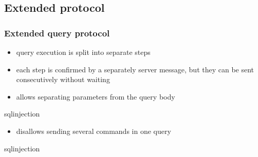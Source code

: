 \documentclass{beamer}
\begin{document}
\subsection{Extended protocol}
\begin{frame}
  \frametitle{Extended query protocol}

  \begin{itemize}
  \item query execution is split into \alert{separate steps}
  \item each step is confirmed by a separately server message, but they can be
    sent \alert{consecutively} without waiting
  \item allows separating parameters from the query body
  \end{itemize}
  \begin{beamercolorbox}[center,sep=1em]{sqlinjection}
  \end{beamercolorbox}

  \begin{itemize}
  \item disallows sending several commands in one query
  \end{itemize}

  \begin{beamercolorbox}[center,sep=1em]{sqlinjection}
  \end{beamercolorbox}
\end{frame}
\end{document}
